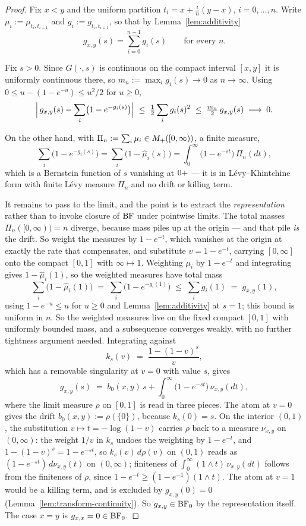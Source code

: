 \begin{proof}
Fix $x < y$ and the uniform partition $t_i = x + \tfrac{i}{n}(y - x)$, $i = 0, \dots, n$.
Write $\mu_i := \mu_{t_i, t_{i+1}}$ and $g_i := g_{t_i, t_{i+1}}$, so that by
Lemma~\ref{lem:additivity}
\[
  g_{x,y}(s) = \sum_{i=0}^{n-1} g_i(s) \qquad \text{for every } n.
\]

Fix $s > 0$. Since $G(\cdot, s)$ is continuous on the compact interval $[x, y]$ it is
uniformly continuous there, so $m_n := \max_i g_i(s) \to 0$ as $n \to \infty$. Using
$0 \le u - (1 - e^{-u}) \le u^2/2$ for $u \ge 0$,
\[
  \Bigl|\, g_{x,y}(s) - \sum_{i}\bigl(1 - e^{-g_i(s)}\bigr) \Bigr|
  \;\le\; \tfrac12 \sum_i g_i(s)^2
  \;\le\; \tfrac{m_n}{2}\, g_{x,y}(s)
  \;\longrightarrow\; 0 .
\]

On the other hand, with $\Pi_n := \sum_i \mu_i \in M_+([0,\infty))$, a finite measure,
\[
  \sum_i \bigl(1 - e^{-g_i(s)}\bigr) = \sum_i \bigl(1 - \hat\mu_i(s)\bigr)
  = \int_0^\infty \bigl(1 - e^{-st}\bigr)\,\Pi_n(dt),
\]
which is a Bernstein function of $s$ vanishing at $0{+}$ --- it is in Lévy--Khintchine form
with finite Lévy measure $\Pi_n$ and no drift or killing term.

It remains to pass to the limit, and the point is to extract the \emph{representation} rather
than to invoke closure of $\mathrm{BF}$ under pointwise limits. The total masses $\Pi_n([0,\infty)) = n$
diverge, because mass piles up at the origin --- and that pile \emph{is} the drift. So weight the
measures by $1 - e^{-t}$, which vanishes at the origin at exactly the rate that compensates, and
substitute $v = 1 - e^{-t}$, carrying $[0,\infty]$ onto the compact $[0,1]$ with
$\infty \mapsto 1$. Weighting $\mu_i$ by $1 - e^{-t}$ and integrating gives $1 - \hat\mu_i(1)$, so
the weighted measures have total mass
\[
  \sum_i \bigl(1 - \hat\mu_i(1)\bigr) \;=\; \sum_i \bigl(1 - e^{-g_i(1)}\bigr)
  \;\le\; \sum_i g_i(1) \;=\; g_{x,y}(1),
\]
using $1 - e^{-u} \le u$ for $u \ge 0$ and Lemma~\ref{lem:additivity} at $s = 1$; this bound is
uniform in $n$. So the weighted measures live on the fixed compact $[0,1]$ with uniformly bounded
mass, and a subsequence converges weakly, with no further tightness argument needed. Integrating
against
\[
  k_s(v) \;=\; \frac{1 - (1-v)^s}{v},
\]
which has a removable singularity at $v = 0$ with value $s$, gives
\[
  g_{x,y}(s) \;=\; b_0(x,y)\,s + \int_0^\infty \bigl(1 - e^{-st}\bigr)\,\nu_{x,y}(dt),
\]
where the limit measure $\rho$ on $[0,1]$ is read in three pieces. The atom at $v = 0$ gives the
drift $b_0(x,y) := \rho(\{0\})$, because $k_s(0) = s$. On the interior $(0,1)$, the substitution
$v \mapsto t = -\log(1-v)$ carries $\rho$ back to a measure $\nu_{x,y}$ on $(0,\infty)$: the
weight $1/v$ in $k_s$ undoes the weighting by $1 - e^{-t}$, and $1 - (1-v)^s = 1 - e^{-st}$, so
$k_s(v)\,d\rho(v)$ on $(0,1)$ reads as $(1 - e^{-st})\,d\nu_{x,y}(t)$ on $(0,\infty)$; finiteness
of $\int_0^\infty (1 \wedge t)\,\nu_{x,y}(dt)$ follows from the finiteness of $\rho$, since
$1 - e^{-t} \ge (1 - e^{-1})(1 \wedge t)$. The atom at $v = 1$ would be a killing term, and is
excluded by $g_{x,y}(0) = 0$ (Lemma~\ref{lem:transform-continuity}). So $g_{x,y} \in \mathrm{BF}_0$ by the
representation itself.
The case $x = y$ is $g_{x,x} = 0 \in \mathrm{BF}_0$.
\end{proof}

